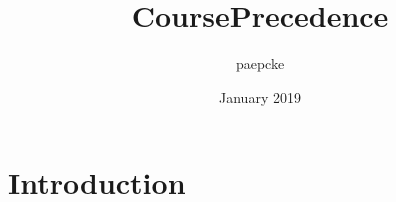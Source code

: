 \documentclass{article}
\title{CoursePrecedence}
\author{paepcke }
\date{January 2019}
\begin{document}
\maketitle

\section{Introduction}
\end{document}
